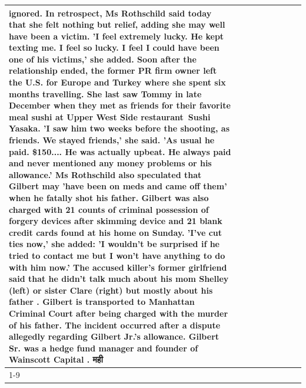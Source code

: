 \begin{table}[H]
\begin{tabular}{lllrlllll}
ignored. In retrospect, Ms Rothschild said today that she felt nothing but relief, adding she may well have been a victim. 'I feel extremely lucky. He kept texting me. I feel so lucky. I feel I could have been one of his victims,' she added. Soon after the relationship ended, the former PR firm owner left the U.S. for Europe and Turkey where she spent six months  travelling. She last saw Tommy in late December when they met as friends for their favorite meal sushi at Upper West Side restaurant Sushi Yasaka. 'I saw him two weeks before the shooting, as friends. We stayed friends,' she said. 'As usual he paid. \$150.... He was actually upbeat. He always paid and never mentioned any money problems or his allowance.' Ms Rothschild also speculated that Gilbert may 'have been on meds and came off them' when he fatally shot his father. Gilbert was also charged with 21 counts of criminal possession of forgery devices after skimming device and 21 blank credit cards found at his home on Sunday. 'I've cut ties now,' she added: 'I wouldn’t be surprised if he tried to contact me but I won’t have anything to do with him now.' The accused killer's former girlfriend said that he didn't talk much about his mom Shelley (left) or sister Clare (right) but mostly about his father . Gilbert is transported to Manhattan Criminal Court  after being charged with the murder of his father. The incident occurred after a dispute allegedly regarding Gilbert Jr.'s allowance. Gilbert Sr. was a hedge fund manager and founder of Wainscott Capital . मही \\
\cline{1-9}

\end{tabular}
\end{table}
